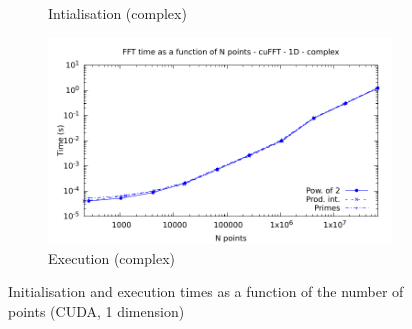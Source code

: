 \documentclass[12pt, a4paper]{article}
\begin{document}
\begin{figure}[H]
\begin{subfigure}{.5\textwidth}
\caption{Intialisation (complex)}
\label{FFTCUDA1DCI}
\end{subfigure}%
\begin{subfigure}{.5\textwidth}
\centering
\includegraphics[width=.9\linewidth]{graphs/fft-cuda-1d-pow2-c-exec.pdf}
\caption{Execution (complex)}
\label{FFTCUDA1DCE}
\end{subfigure}
\caption{Initialisation and execution times as a function of the number of points (CUDA, 1 dimension)}
\label{FFTCUDA1D}
\end{figure}
\end{document}
